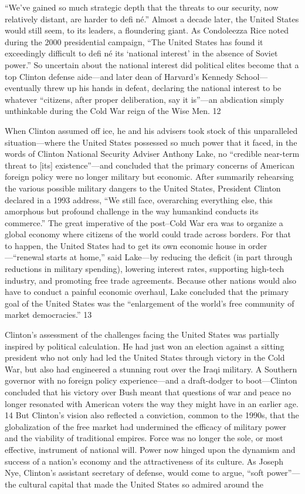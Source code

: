 “We’ve gained so much strategic depth that the threats to our security, now relatively distant, are harder to defi né.” Almost a decade later, the United States would still seem, to its leaders, a floundering giant. As Condoleezza Rice noted during the 2000 presidential campaign, “The United States has found it exceedingly difficult to defi né its ‘national interest’ in the absence of Soviet power.” So uncertain about the national interest did political elites become that a top Clinton defense aide—and later dean of Harvard’s Kennedy School— eventually threw up his hands in defeat, declaring the national interest to be whatever “citizens, after proper deliberation, say it is”—an abdication simply unthinkable during the Cold War reign of the Wise Men. {\color{blue} 12 } {\par} When Clinton assumed off ice, he and his advisers took stock of this unparalleled situation—where the United States possessed so much power that it faced, in the words of Clinton National Security Adviser Anthony Lake, no “credible near-term threat to [its] existence”—and concluded that the primary concerns of American foreign policy were no longer military but economic. After summarily rehearsing the various possible military dangers to the United States, President Clinton declared in a 1993 address, “We still face, overarching everything else, this amorphous but profound challenge in the way humankind conducts its commerce.” The great imperative of the post–Cold War era was to organize a global economy where citizens of the world could trade across borders. For that to happen, the United States had to get its own economic house in order—“renewal starts at home,” said Lake—by reducing the deficit (in part through reductions in military spending), lowering interest rates, supporting high-tech industry, and promoting free trade agreements. Because other nations would also have to conduct a painful economic overhaul, Lake concluded that the primary goal of the United States was the “enlargement of the world’s free community of market democracies.” {\color{blue} 13 } {\par} Clinton’s assessment of the challenges facing the United States was partially inspired by political calculation. He had just won an election against a sitting president who not only had led the United States through victory in the Cold War, but also had engineered a stunning rout over the Iraqi military. A Southern governor with no foreign policy experience—and a draft-dodger to boot—Clinton concluded that his victory over Bush meant that questions of war and peace no longer resonated with American voters the way they might have in an earlier age. {\color{blue} 14 } But Clinton’s vision also reflected a conviction, common to the 1990s, that the globalization of the free market had undermined the efficacy of military power and the viability of traditional empires. Force was no longer the sole, or most effective, instrument of national will. Power now hinged upon the dynamism and success of a nation’s economy and the attractiveness of its culture. As Joseph Nye, Clinton’s assistant secretary of defense, would come to argue, “soft power”—the cultural capital that made the United States so admired around the 